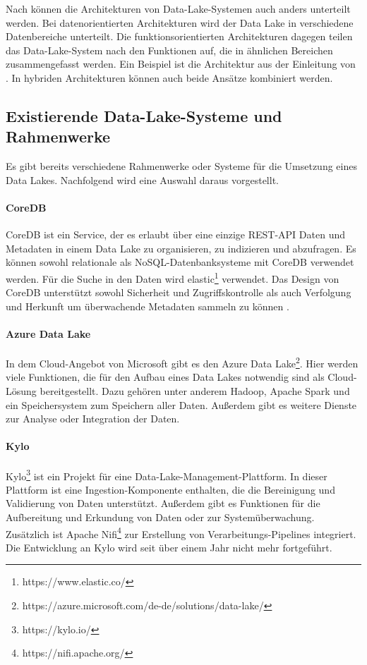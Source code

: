 Nach \textcite{sawadogo2021data} können die Architekturen von Data-Lake-Systemen auch anders unterteilt werden.
Bei datenorientierten Architekturen wird der Data Lake in verschiedene Datenbereiche unterteilt.
Die funktionsorientierten Architekturen dagegen teilen das Data-Lake-System nach den Funktionen auf, die in ähnlichen Bereichen zusammengefasst werden.
Ein Beispiel ist die Architektur aus der Einleitung von \textcite{datalake_03}.
In hybriden Architekturen können auch beide Ansätze kombiniert werden.

\subsection{Existierende Data-Lake-Systeme und Rahmenwerke}
Es gibt bereits verschiedene Rahmenwerke oder Systeme für die Umsetzung eines Data Lakes.
Nachfolgend wird eine Auswahl daraus vorgestellt.

\paragraph{CoreDB} CoreDB ist ein Service, der es erlaubt über eine einzige REST-API Daten und Metadaten in einem Data Lake zu organisieren, zu indizieren und abzufragen. 
Es können sowohl relationale als NoSQL-Datenbanksysteme mit CoreDB verwendet werden.
Für die Suche in den Daten wird elastic\footnote{https://www.elastic.co/} verwendet.
Das Design von CoreDB unterstützt sowohl Sicherheit und Zugriffskontrolle als auch Verfolgung und Herkunft um überwachende Metadaten sammeln zu können \parencite{coredb}.

\paragraph{Azure Data Lake} In dem Cloud-Angebot von Microsoft gibt es den Azure Data Lake\footnote{https://azure.microsoft.com/de-de/solutions/data-lake/}.
Hier werden viele Funktionen, die für den Aufbau eines Data Lakes notwendig sind als Cloud-Lösung bereitgestellt.
Dazu gehören unter anderem Hadoop, Apache Spark und ein Speichersystem zum Speichern aller Daten.
Außerdem gibt es weitere Dienste zur Analyse oder Integration der Daten.

\paragraph{Kylo} Kylo\footnote{https://kylo.io/} ist ein Projekt für eine Data-Lake-Management-Plattform.
In dieser Plattform ist eine Ingestion-Komponente enthalten, die die Bereinigung und Validierung von Daten unterstützt.
Außerdem gibt es Funktionen für die Aufbereitung und Erkundung von Daten oder zur Systemüberwachung.
Zusätzlich ist Apache Nifi\footnote{https://nifi.apache.org/} zur Erstellung von Verarbeitungs-Pipelines integriert.
Die Entwicklung an Kylo wird seit über einem Jahr nicht mehr fortgeführt.

